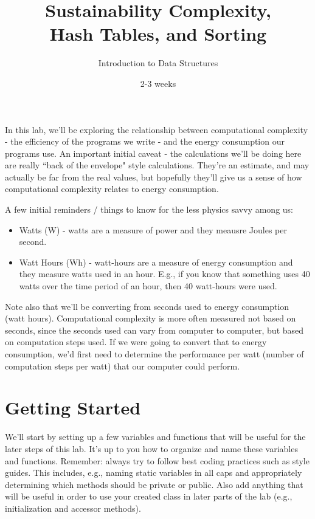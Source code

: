 \documentclass[12pt]{article}
\title{Sustainability Complexity,\\Hash Tables, and Sorting}
\author{Introduction to Data Structures}
\date{2-3 weeks} %
\begin{document}
\maketitle



In this lab, we'll be exploring the relationship between computational complexity - the efficiency of the programs we write - and the energy consumption our programs use. An important initial caveat - the calculations we'll be doing here are really ``back of the envelope" style calculations. They're an estimate, and may actually be far from the real values, but hopefully they'll give us a sense of how computational complexity relates to energy consumption.

A few initial reminders / things to know for the less physics savvy among us:
\begin{itemize}
\item Watts (W) - watts are a measure of power and they meausre Joules per second.
\item Watt Hours (Wh) - watt-hours are a measure of energy consumption and they measure watts used in an hour.  E.g., if you know that something uses 40 watts over the time period of an hour, then 40 watt-hours were used.
\end{itemize}

Note also that we'll be converting from seconds used to energy consumption (watt hours). Computational complexity is more often measured not based on seconds, since the seconds used can vary from computer to computer, but based on computation steps used. If we were going to convert that to energy consumption, we'd first need to determine the performance per watt (number of computation steps per watt) that our computer could perform.

\section{Getting Started}

We'll start by setting up a few variables and functions that will be useful for the later steps of this lab.  It's up to you how to organize and name these variables and functions.  Remember: always try to follow best coding practices such as style guides.  This includes, e.g., naming static variables in all caps and appropriately determining which methods should be private or public.  Also add anything that will be useful in order to use your created class in later parts of the lab (e.g., initialization and accessor methods).
\end{document}
